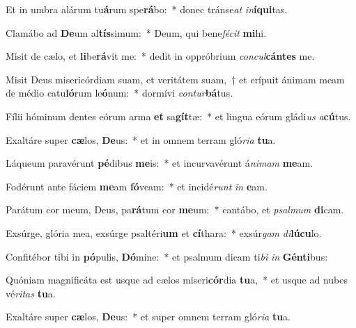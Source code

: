 \item Et in umbra alárum tu\textbf{á}rum spe\textbf{rá}bo:~* donec tránse\textit{at} \textit{in}\textbf{í}\textbf{qui}tas.
\item Clamábo ad \textbf{De}um al\textbf{tís}simum:~* Deum, qui bene\textit{fé}\textit{cit} \textbf{mi}hi.
\item Misit de cælo, et \textbf{li}be\textbf{rá}vit me:~* dedit in oppróbrium \textit{con}\textit{cul}\textbf{cán}\textbf{tes} me.
\item Misit Deus misericórdiam suam, et veritátem suam,~† et erípuit ánimam meam de médio catu\textbf{ló}rum le\textbf{ó}num:~* dormívi \textit{con}\textit{tur}\textbf{bá}tus.
\item Fílii hóminum dentes eórum arma \textbf{et} sa\textbf{gít}tæ:~* et lingua eórum gládi\textit{us} \textit{a}\textbf{cú}tus.
\item Exaltáre super \textbf{cæ}los, \textbf{De}us:~* et in omnem terram gló\textit{ri}\textit{a} \textbf{tu}a.
\item Láqueum paravérunt \textbf{pé}dibus \textbf{me}is:~* et incurvavérunt á\textit{ni}\textit{mam} \textbf{me}am.
\item Fodérunt ante fáciem \textbf{me}am \textbf{fó}veam:~* et incidé\textit{runt} \textit{in} \textbf{e}am.
\item Parátum cor meum, Deus, pa\textbf{rá}tum cor \textbf{me}um:~* cantábo, et \textit{psal}\textit{mum} \textbf{di}cam.
\item Exsúrge, glória mea, exsúrge psaltéri\textbf{um} et \textbf{cí}thara:~* exsúr\textit{gam} \textit{di}\textbf{lú}\textbf{cu}lo.
\item Confitébor tibi in \textbf{pó}pulis, \textbf{Dó}mine:~* et psalmum dicam ti\textit{bi} \textit{in} \textbf{Gén}\textbf{ti}bus:
\item Quóniam magnificáta est usque ad cælos miseri\textbf{cór}dia \textbf{tu}a,~* et usque ad nubes vé\textit{ri}\textit{tas} \textbf{tu}a.
\item Exaltáre super \textbf{cæ}los, \textbf{De}us:~* et super omnem terram gló\textit{ri}\textit{a} \textbf{tu}a.
